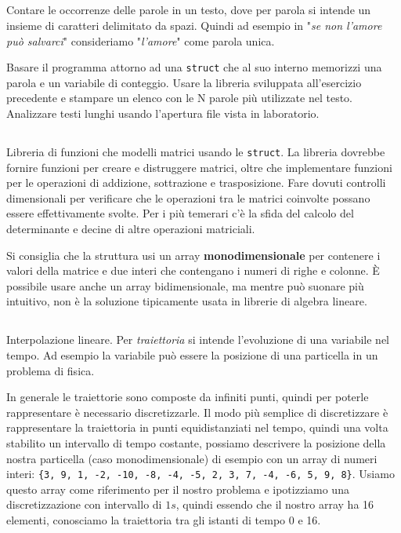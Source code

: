 \documentclass{article}
\begin{document}
\subsection{}
Contare le occorrenze delle parole in un testo, dove per parola si intende un insieme di caratteri delimitato da spazi. Quindi ad esempio in "\textit{se non l'amore può salvarci}" consideriamo "\textit{l'amore}" come parola unica.

\begin{info}
Basare il programma attorno ad una \texttt{struct} che al suo interno memorizzi una parola e un variabile di conteggio. Usare la libreria sviluppata all'esercizio precedente e stampare un elenco con le N parole più utilizzate nel testo. Analizzare testi lunghi usando l'apertura file vista in laboratorio.
\end{info}

\clearpage

\subsection{}
Libreria di funzioni che modelli matrici usando le \texttt{struct}. La libreria dovrebbe fornire funzioni per creare e distruggere matrici, oltre che implementare funzioni per le operazioni di addizione, sottrazione e trasposizione. Fare dovuti controlli dimensionali per verificare che le operazioni tra le matrici coinvolte possano essere effettivamente svolte. Per i più temerari c'è la sfida del calcolo del determinante e decine di altre operazioni matriciali. 

\begin{info}
	Si consiglia che la struttura usi un array \textbf{monodimensionale} per contenere i valori della matrice e due interi che contengano i numeri di righe e colonne. È possibile usare anche un array bidimensionale, ma mentre può suonare più intuitivo, non è la soluzione tipicamente usata in librerie di algebra lineare. 
\end{info}


\subsection{}
Interpolazione lineare. Per \textit{traiettoria} si intende l'evoluzione di una variabile nel tempo. Ad esempio la variabile può essere la posizione di una particella in un problema di fisica. 

In generale le traiettorie sono composte da infiniti punti, quindi per poterle rappresentare è necessario discretizzarle. Il modo più semplice di discretizzare è rappresentare la traiettoria in punti equidistanziati nel tempo, quindi una volta stabilito un intervallo di tempo costante, possiamo descrivere la posizione della nostra particella (caso monodimensionale) di esempio con un array di numeri interi: \texttt{\{3, 9, 1, -2, -10, -8, -4, -5, 2, 3, 7, -4, -6, 5, 9, 8\}}. Usiamo questo array come riferimento per il nostro problema e ipotizziamo una discretizzazione con intervallo di $1s$, quindi essendo che il nostro array ha 16 elementi, conosciamo la traiettoria tra gli istanti di tempo 0 e 16. 
\end{document}
